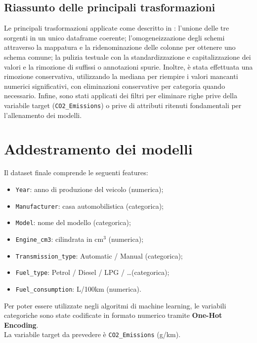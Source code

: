\documentclass[a4paper,12pt]{report}
\begin{document}
	\subsection{Riassunto delle principali trasformazioni}
	Le principali trasformazioni applicate come descritto in \cite{olivi2024car}: l'unione delle tre sorgenti in un unico dataframe coerente; l'omogeneizzazione degli schemi attraverso la mappatura e la ridenominazione delle colonne per ottenere uno schema comune; la pulizia testuale con la standardizzazione e capitalizzazione dei valori e la rimozione di suffissi o annotazioni spurie. Inoltre, è stata effettuata una rimozione conservativa, utilizzando la mediana per riempire i valori mancanti numerici significativi, con eliminazioni conservative per categoria quando necessario. Infine, sono stati applicati dei filtri per eliminare righe prive della variabile target (\texttt{CO2\_Emissions}) o prive di attributi ritenuti fondamentali per l'allenamento dei modelli.
	
	\section{Addestramento dei modelli}
	
	Il dataset finale comprende le seguenti features:
	\begin{itemize}
		\item \texttt{Year}: anno di produzione del veicolo (numerica);
		\item \texttt{Manufacturer}: casa automobilistica (categorica);
		\item \texttt{Model}: nome del modello (categorica);
		\item \texttt{Engine\_cm3}: cilindrata in \(\mathrm{cm^3}\) (numerica);
		\item \texttt{Transmission\_type}: Automatic / Manual (categorica);
		\item \texttt{Fuel\_type}: Petrol / Diesel / LPG / \ldots (categorica);
		\item \texttt{Fuel\_consumption}: L/100km (numerica).
	\end{itemize}
	Per poter essere utilizzate negli algoritmi di machine learning, le variabili categoriche sono state codificate in formato numerico tramite \textbf{One-Hot Encoding}. \\
	La variabile target da prevedere è \texttt{CO2\_Emissions} (g/km).
	
\end{document}
